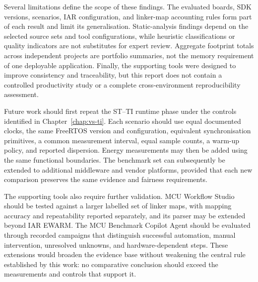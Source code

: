 Several limitations define the scope of these findings. The evaluated boards, SDK versions,
scenarios, IAR configuration, and linker-map accounting rules form part of each result and
limit its generalisation. Static-analysis findings depend on the selected source sets and
tool configurations, while heuristic classifications or quality indicators are not
substitutes for expert review. Aggregate footprint totals across independent projects are
portfolio summaries, not the memory requirement of one deployable application. Finally, the
supporting tools were designed to improve consistency and traceability, but this report does
not contain a controlled productivity study or a complete cross-environment reproducibility
assessment.

Future work should first repeat the ST--TI runtime phase under the controls identified in
Chapter~\ref{chap:vs-ti}. Each scenario should use equal documented clocks, the same FreeRTOS
version and configuration, equivalent synchronisation primitives, a common measurement
interval, equal sample counts, a warm-up policy, and reported dispersion. Energy measurements
may then be added using the same functional boundaries. The benchmark set can subsequently be
extended to additional middleware and vendor platforms, provided that each new comparison
preserves the same evidence and fairness requirements.

The supporting tools also require further validation. MCU Workflow Studio should be tested
against a larger labelled set of linker maps, with mapping accuracy and repeatability
reported separately, and its parser may be extended beyond IAR EWARM. The MCU Benchmark
Copilot Agent should be evaluated through recorded campaigns that distinguish successful
automation, manual intervention, unresolved unknowns, and hardware-dependent steps. These
extensions would broaden the evidence base without weakening the central rule established
by this work: no comparative conclusion should exceed the measurements and controls that
support it.